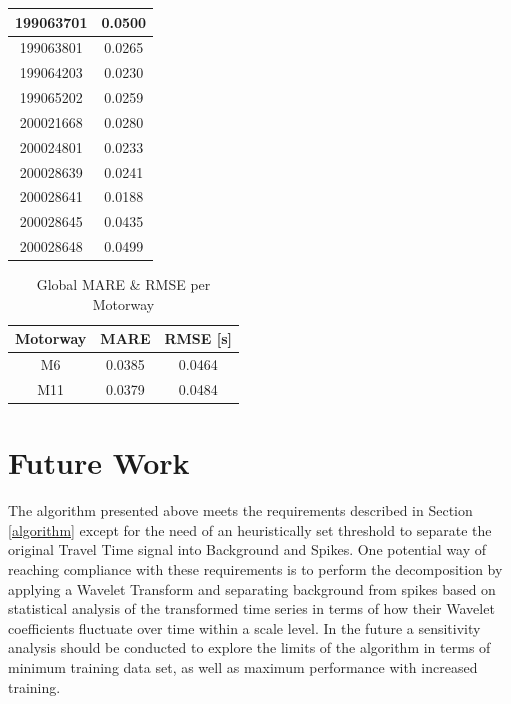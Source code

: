 \documentclass[letterpaper, 10 pt, conference]{ieeeconf}  %
\begin{document}
\begin{table}[htbp]
\begin{center}
\begin{tabular}{|c|c|}
			\hline
			199063701& 0.0500\\
			\hline
			199063801& 0.0265\\
			\hline
			199064203& 0.0230\\
			\hline
			199065202& 0.0259\\
			\hline
			200021668& 0.0280\\
			\hline
			200024801& 0.0233\\
			\hline
			200028639& 0.0241\\
			\hline
			200028641& 0.0188\\
			\hline
			200028645& 0.0435\\
			\hline
			200028648& 0.0499\\
			\hline
		\end{tabular}
		\label{tab1}
	\end{center}
	\label{table:m6mape}
\end{table}

\begin{table}[htbp]
	\caption{Global MARE \& RMSE per Motorway}
	\begin{center}
		\begin{tabular}{|c|c|c|}
			\hline
			\textbf{Motorway}&{\textbf{MARE}}&{\textbf{RMSE [s]}} \\
			\hline
			M6& 0.0385& 0.0464\\
			\hline
			M11& 0.0379& 0.0484\\
			\hline
		\end{tabular}
		\label{mapeglobal}
	\end{center}
\end{table}

\section{Future Work}
The algorithm presented above meets the requirements described in Section \ref{algorithm} except for the need of an heuristically set threshold to separate the original Travel Time signal into Background and Spikes.
One potential way of reaching compliance with these requirements is to perform the decomposition by applying a Wavelet Transform and separating background from spikes based on statistical analysis of the transformed time series in terms of how their Wavelet coefficients fluctuate over time within a scale level. 
In the future a sensitivity analysis should be conducted to explore the limits of the algorithm in terms of minimum training data set, as well as maximum performance with increased training.\\
\end{document}

